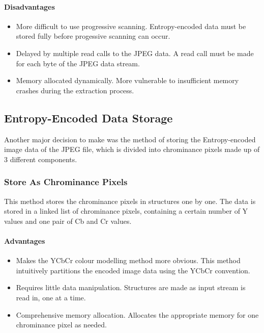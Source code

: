 \paragraph*{Disadvantages}
\begin{itemize}
	\item More difficult to use progressive scanning. Entropy-encoded data must be stored fully before progessive scanning can occur.
	\item Delayed by multiple read calls to the JPEG data. A read call must be made for each byte of the JPEG data stream.
	\item Memory allocated dynamically. More vulnerable to insufficient memory crashes during the extraction process.
\end{itemize}

\subsection*{Entropy-Encoded Data Storage}

Another major decision to make was the method of storing the Entropy-encoded image data of the JPEG file, 
which is divided into chrominance pixels made up of 3 different components.

\subsubsection*{Store As Chrominance Pixels}

This method stores the chrominance pixels in structures one by one. 
The data is stored in a linked list of chrominance pixels, containing a certain number of Y values and one pair of Cb and Cr values.

\paragraph*{Advantages}
\begin{itemize}
	\item Makes the YCbCr colour modelling method more obvious. 
		This method intuitively partitions the encoded image data using the YCbCr convention.
	\item Requires little data manipulation. Structures are made as input stream is read in, one at a time.
	\item Comprehensive memory allocation. Allocates the appropriate memory for one chrominance pixel as needed.
\end{itemize}

